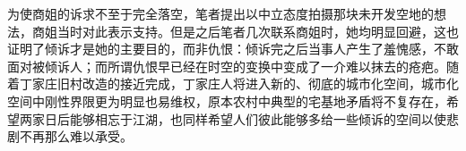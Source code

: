   为使商姐的诉求不至于完全落空，笔者提出以中立态度拍摄那块未开发空地的想法，商姐当时对此表示支持。但是之后笔者几次联系商姐时，她均明显回避，这也证明了倾诉才是她的主要目的，而非仇恨：倾诉完之后当事人产生了羞愧感，不敢面对被倾诉人；而所谓仇恨早已经在时空的变换中变成了一介难以抹去的疮疤。随着丁家庄旧村改造的接近完成，丁家庄人将进入新的、彻底的城市化空间，城市化空间中刚性界限更为明显也易维权，原本农村中典型的宅基地矛盾将不复存在，希望两家日后能够相忘于江湖，也同样希望人们彼此能够多给一些倾诉的空间以使悲剧不再那么难以承受。



